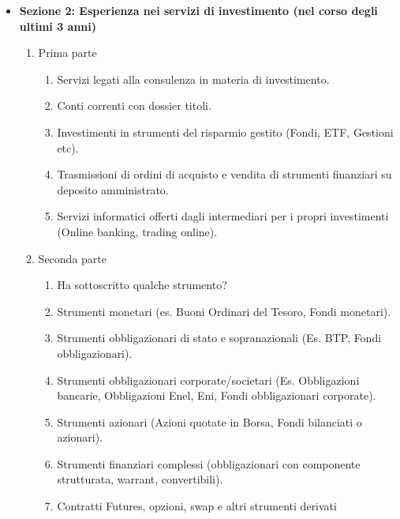 \begin{itemize}
\begin{enumerate}
    \end{enumerate}

    \item \textbf{Sezione 2: Esperienza nei servizi di investimento (nel corso degli ultimi 3 anni)}

    \begin{enumerate}[label*=\arabic*.]
        \item Prima parte

        \begin{enumerate}[label*=\arabic*.]
            \item Servizi legati alla consulenza in materia di investimento.
            \boolans
            \item Conti correnti con dossier titoli.
            \boolans
            \item Investimenti in strumenti del risparmio gestito (Fondi, ETF, Gestioni etc).
            \boolans
            \item Trasmissioni di ordini di acquisto e vendita di strumenti finanziari su deposito amministrato.
            \boolans
            \item Servizi informatici offerti dagli intermediari per i propri investimenti (Online banking, trading online).
            \boolans
        \end{enumerate}

        \item Seconda parte

        \begin{enumerate}[label*=\arabic*.]
            \item Ha sottoscritto qualche strumento?
            \boolans
            \item Strumenti monetari (es. Buoni Ordinari del Tesoro, Fondi monetari).
            \boolans
            \item Strumenti obbligazionari di stato e sopranazionali (Es. BTP, Fondi obbligazionari).
            \boolans
            \item Strumenti obbligazionari corporate/societari (Es. Obbligazioni bancarie, Obbligazioni Enel, Eni, Fondi obbligazionari corporate).
            \boolans
            \item Strumenti azionari (Azioni quotate in Borsa, Fondi bilanciati o azionari).
            \boolans
            \item Strumenti finanziari complessi (obbligazionari con componente strutturata, warrant, convertibili).
            \boolans
            \item Contratti Futures, opzioni, swap e altri strumenti derivati
            \boolans
        \end{enumerate}


\end{enumerate}
\end{itemize}
